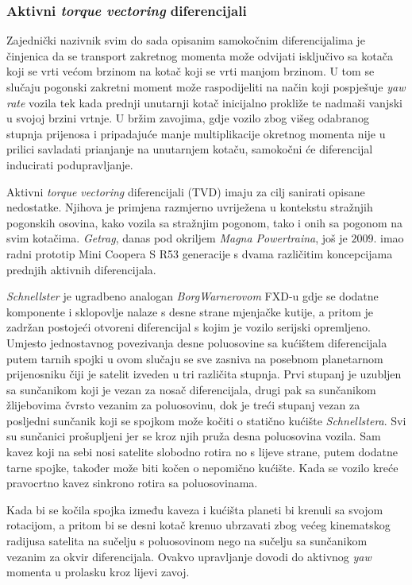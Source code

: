 \documentclass[11pt]{article}
\numberwithin{equation}{section}%
\begin{document}
\subsubsection{Aktivni \textit{torque vectoring} diferencijali}

Zajednički nazivnik svim do sada opisanim samokočnim diferencijalima je činjenica da se transport zakretnog momenta može odvijati isključivo sa kotača koji se vrti većom brzinom na kotač koji se vrti manjom brzinom. U tom se slučaju pogonski zakretni moment može raspodijeliti na način koji pospješuje \textit{yaw rate} vozila tek kada prednji unutarnji kotač inicijalno prokliže te nadmaši vanjski u svojoj brzini vrtnje. U bržim zavojima, gdje vozilo zbog višeg odabranog stupnja prijenosa i pripadajuće manje multiplikacije okretnog momenta nije u prilici savladati prianjanje na unutarnjem kotaču, samokočni će diferencijal inducirati podupravljanje.

Aktivni \textit{torque vectoring} diferencijali (TVD) imaju za cilj sanirati opisane nedostatke. Njihova je primjena razmjerno uvriježena u kontekstu stražnjih pogonskih osovina, kako vozila sa stražnjim pogonom, tako i onih sa pogonom na svim kotačima. \textit{Getrag}, danas pod okriljem \textit{Magna Powertraina}, još je $2009.$ imao radni prototip Mini Coopera S R53 generacije s dvama različitim koncepcijama prednjih aktivnih diferencijala. 

\textit{Schnellster} je ugradbeno analogan \textit{BorgWarnerovom} FXD-u gdje se dodatne komponente i sklopovlje nalaze s desne strane mjenjačke kutije, a pritom je zadržan postojeći otvoreni diferencijal s kojim je vozilo serijski opremljeno. Umjesto jednostavnog povezivanja desne poluosovine sa kućištem diferencijala putem tarnih spojki u ovom slučaju se sve zasniva na posebnom planetarnom prijenosniku čiji je satelit izveden u tri različita stupnja. Prvi stupanj je uzubljen sa sunčanikom koji je vezan za nosač diferencijala, drugi pak sa sunčanikom žlijebovima čvrsto vezanim za poluosovinu, dok je treći stupanj vezan za posljedni sunčanik koji se spojkom može kočiti o statično kućište \textit{Schnellstera}. Svi su sunčanici prošupljeni jer se kroz njih pruža desna poluosovina vozila. Sam kavez koji na sebi nosi satelite slobodno rotira no s lijeve strane, putem dodatne tarne spojke, također može biti kočen o nepomično kućište. Kada se vozilo kreće pravocrtno kavez sinkrono rotira sa poluosovinama.

Kada bi se kočila spojka između kaveza i kućišta planeti bi krenuli sa svojom rotacijom, a pritom bi se desni kotač krenuo ubrzavati zbog većeg kinematskog radijusa satelita na sučelju s poluosovinom nego na sučelju sa sunčanikom vezanim za okvir diferencijala. Ovakvo upravljanje dovodi do aktivnog \textit{yaw} momenta u prolasku kroz lijevi zavoj.
\end{document}
